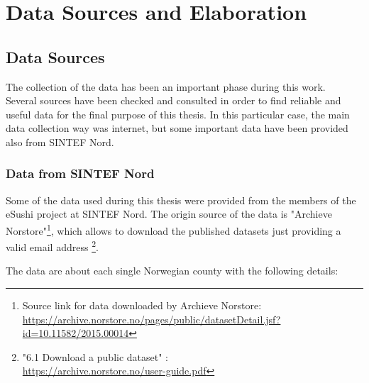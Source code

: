 
\newpage
\chapter{Data Sources and Elaboration}
\label{Data_collection}
\section{Data Sources}
The collection of the data has been an important phase during this work. \\
Several sources have been checked and consulted in order to find reliable and useful data for the final purpose of this thesis. In this particular case, the main data collection way was internet, but some important data have been provided also from SINTEF Nord.
\citation{}

\subsection{Data from SINTEF Nord}
Some of the data used during this thesis were provided from the members of the eSushi project at SINTEF Nord.
The origin source of the data is "Archieve Norstore"\footnote{Source link for data downloaded by Archieve Norstore: \\\url{https://archive.norstore.no/pages/public/datasetDetail.jsf?id=10.11582/2015.00014}}, which allows to download the published datasets just providing a valid email address \footnote{"6.1 Download a public dataset" : \\ \url{https://archive.norstore.no/user-guide.pdf}}. 

The data are about each single Norwegian county with the following details:\\

\begin{table}[ht]
    \caption{Data provided from SINTEF Nord. }
    \label{table: SINTEF_Data} 
\end{table}



